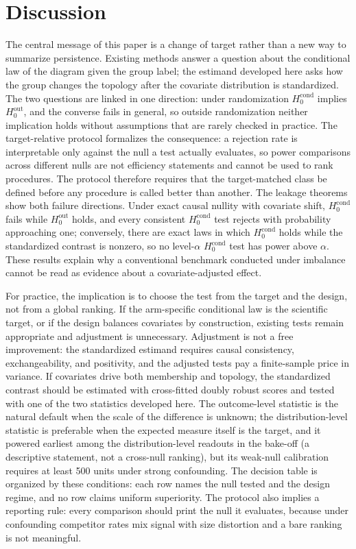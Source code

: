 \section{Discussion}

The central message of this paper is a change of target rather than a new way to summarize persistence. Existing methods answer a question about the conditional law of the diagram given the group label; the estimand developed here asks how the group changes the topology after the covariate distribution is standardized. The two questions are linked in one direction: under randomization $H_0^{\mathrm{cond}}$ implies $H_0^{\mathrm{out}}$, and the converse fails in general, so outside randomization neither implication holds without assumptions that are rarely checked in practice. The target-relative protocol formalizes the consequence: a rejection rate is interpretable only against the null a test actually evaluates, so power comparisons across different nulls are not efficiency statements and cannot be used to rank procedures. The protocol therefore requires that the target-matched class be defined before any procedure is called better than another. The leakage theorems show both failure directions. Under exact causal nullity with covariate shift, $H_0^{\mathrm{cond}}$ fails while $H_0^{\mathrm{out}}$ holds, and every consistent $H_0^{\mathrm{cond}}$ test rejects with probability approaching one; conversely, there are exact laws in which $H_0^{\mathrm{cond}}$ holds while the standardized contrast is nonzero, so no level-$\alpha$ $H_0^{\mathrm{cond}}$ test has power above $\alpha$. These results explain why a conventional benchmark conducted under imbalance cannot be read as evidence about a covariate-adjusted effect.

For practice, the implication is to choose the test from the target and the design, not from a global ranking. If the arm-specific conditional law is the scientific target, or if the design balances covariates by construction, existing tests remain appropriate and adjustment is unnecessary. Adjustment is not a free improvement: the standardized estimand requires causal consistency, exchangeability, and positivity, and the adjusted tests pay a finite-sample price in variance. If covariates drive both membership and topology, the standardized contrast should be estimated with cross-fitted doubly robust scores \cite{chernozhukov_dml_2018,kennedy_drlearner_2023} and tested with one of the two statistics developed here. The outcome-level statistic is the natural default when the scale of the difference is unknown; the distribution-level statistic is preferable when the expected measure itself is the target, and it powered earliest among the distribution-level readouts in the bake-off (a descriptive statement, not a cross-null ranking), but its weak-null calibration requires at least 500 units under strong confounding. The decision table is organized by these conditions: each row names the null tested and the design regime, and no row claims uniform superiority. The protocol also implies a reporting rule: every comparison should print the null it evaluates, because under confounding competitor rates mix signal with size distortion and a bare ranking is not meaningful.

